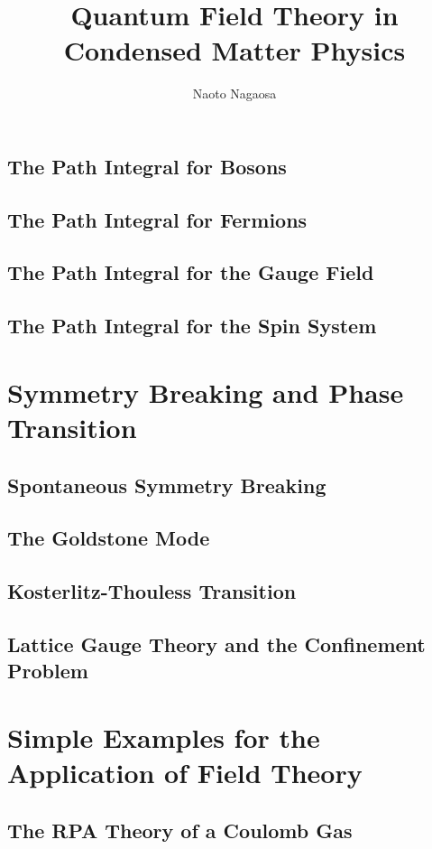 \documentclass[twoside,11pt]{report}
\title{Quantum Field Theory in Condensed Matter Physics}
\author{Naoto Nagaosa}
\begin{document}
\maketitle
\tableofcontents
\setcounter{page}{0}










\section{The Path Integral for Bosons}
\section{The Path Integral for Fermions}
\section{The Path Integral for the Gauge Field}
\section{The Path Integral for the Spin System}
\chapter{Symmetry Breaking and Phase Transition}
\section{Spontaneous Symmetry Breaking}
\section{The Goldstone Mode}
\section{Kosterlitz-Thouless Transition}
\section{Lattice Gauge Theory and the Confinement Problem}
\chapter{Simple Examples for the Application of Field Theory}
\section{The RPA Theory of a Coulomb Gas}
\end{document}
